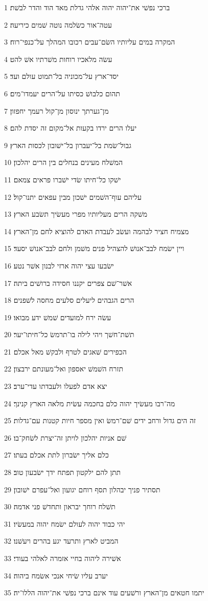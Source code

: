 \par 1 ברכי נפשׁי את־יהוה יהוה אלהי גדלת מאד הוד והדר לבשׁת׃
\par 2 עטה־אור כשׂלמה נוטה שׁמים כיריעה׃
\par 3 המקרה במים עליותיו השׂם־עבים רכובו המהלך על־כנפי־רוח׃
\par 4 עשׂה מלאכיו רוחות משׁרתיו אשׁ להט׃
\par 5 יסד־ארץ על־מכוניה בל־תמוט עולם ועד׃
\par 6 תהום כלבושׁ כסיתו על־הרים יעמדו־מים׃
\par 7 מן־גערתך ינוסון מן־קול רעמך יחפזון׃
\par 8 יעלו הרים ירדו בקעות אל־מקום זה יסדת להם׃
\par 9 גבול־שׂמת בל־יעברון בל־ישׁובון לכסות הארץ׃
\par 10 המשׁלח מעינים בנחלים בין הרים יהלכון׃
\par 11 ישׁקו כל־חיתו שׂדי ישׁברו פראים צמאם׃
\par 12 עליהם עוף־השׁמים ישׁכון מבין עפאים יתנו־קול׃
\par 13 משׁקה הרים מעליותיו מפרי מעשׂיך תשׂבע הארץ׃
\par 14 מצמיח חציר לבהמה ועשׂב לעבדת האדם להוציא לחם מן־הארץ׃
\par 15 ויין ישׂמח לבב־אנושׁ להצהיל פנים משׁמן ולחם לבב־אנושׁ יסעד׃
\par 16 ישׂבעו עצי יהוה ארזי לבנון אשׁר נטע׃
\par 17 אשׁר־שׁם צפרים יקננו חסידה ברושׁים ביתה׃
\par 18 הרים הגבהים ליעלים סלעים מחסה לשׁפנים׃
\par 19 עשׂה ירח למועדים שׁמשׁ ידע מבואו׃
\par 20 תשׁת־חשׁך ויהי לילה בו־תרמשׂ כל־חיתו־יער׃
\par 21 הכפירים שׁאגים לטרף ולבקשׁ מאל אכלם׃
\par 22 תזרח השׁמשׁ יאספון ואל־מעונתם ירבצון׃
\par 23 יצא אדם לפעלו ולעבדתו עדי־ערב׃
\par 24 מה־רבו מעשׂיך יהוה כלם בחכמה עשׂית מלאה הארץ קנינך׃
\par 25 זה הים גדול ורחב ידים שׁם־רמשׂ ואין מספר חיות קטנות עם־גדלות׃
\par 26 שׁם אניות יהלכון לויתן זה־יצרת לשׂחק־בו׃
\par 27 כלם אליך ישׂברון לתת אכלם בעתו׃
\par 28 תתן להם ילקטון תפתח ידך ישׂבעון טוב׃
\par 29 תסתיר פניך יבהלון תסף רוחם יגועון ואל־עפרם ישׁובון׃
\par 30 תשׁלח רוחך יבראון ותחדשׁ פני אדמה׃
\par 31 יהי כבוד יהוה לעולם ישׂמח יהוה במעשׂיו׃
\par 32 המביט לארץ ותרעד יגע בהרים ויעשׁנו׃
\par 33 אשׁירה ליהוה בחיי אזמרה לאלהי בעודי׃
\par 34 יערב עליו שׂיחי אנכי אשׂמח ביהוה׃
\par 35 יתמו חטאים מן־הארץ ורשׁעים עוד אינם ברכי נפשׁי את־יהוה הללו־יה׃

